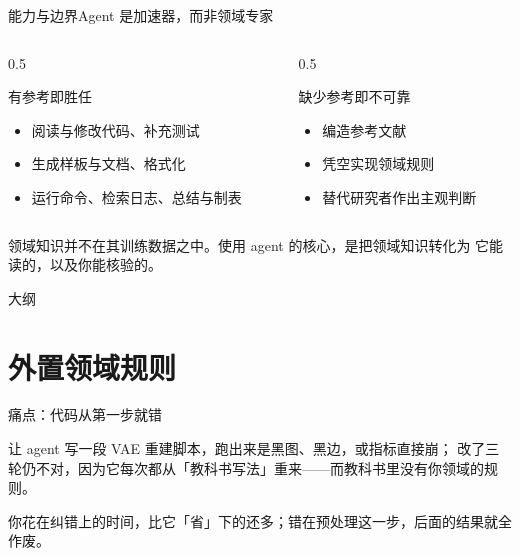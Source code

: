 \documentclass[aspectratio=169]{beamer}
\begin{document}
\begin{frame}{能力与边界}{Agent 是加速器，而非领域专家}
  \begin{columns}[T]
    \begin{column}{0.5\textwidth}
      \begin{exampleblock}{有参考即胜任}
        \begin{itemize}
          \item 阅读与修改代码、补充测试
          \item 生成样板与文档、格式化
          \item 运行命令、检索日志、总结与制表
        \end{itemize}
      \end{exampleblock}
    \end{column}
    \begin{column}{0.5\textwidth}
      \begin{alertblock}{缺少参考即不可靠}
        \begin{itemize}
          \item 编造参考文献
          \item 凭空实现领域规则
          \item 替代研究者作出主观判断
        \end{itemize}
      \end{alertblock}
    \end{column}
  \end{columns}
  \bigskip
  领域知识并不在其训练数据之中。使用 agent 的核心，是把领域知识转化为
  它能读的，以及你能核验的。
\end{frame}

\begin{frame}{大纲}
  \tableofcontents
\end{frame}

\section[外置规则]{外置领域规则}

\begin{frame}{\textcolor{hot}{痛点}：代码从第一步就错}
  \begin{alertblock}{}
    让 agent 写一段 VAE 重建脚本，跑出来是黑图、黑边，或指标直接崩；
    改了三轮仍不对，因为它每次都从「教科书写法」重来——而教科书里没有你领域的规则。
  \end{alertblock}
  \bigskip
  你花在纠错上的时间，比它「省」下的还多；错在预处理这一步，后面的结果就全作废。
\end{frame}
\end{document}
